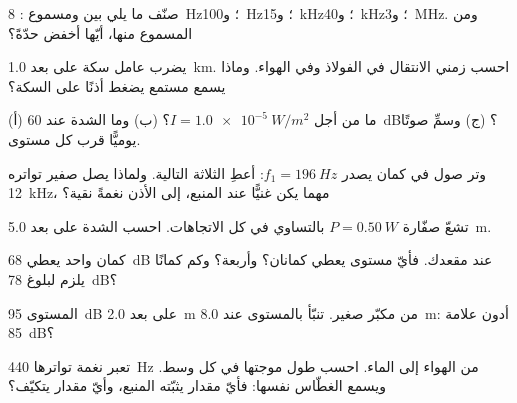 \begin{exercise}[$\star$]\label{exo:g12:sound-acoustics:2}
صنّف ما يلي بين  ومسموع : \qty{8}{Hz}؛
و\qty{100}{Hz}؛ و\qty{15}{kHz}؛ و\qty{40}{kHz}؛ و\qty{3}{MHz}. ومن المسموع
منها، أيّها أخفض حدّةً؟
\end{exercise}

\begin{exercise}[$\star$]\label{exo:g12:sound-acoustics:3}
يضرب عامل سكة على بعد \qty{1.0}{km}. احسب زمني الانتقال
في الفولاذ وفي الهواء. وماذا يسمع مستمع يضغط أذنًا
على السكة؟
\end{exercise}

\begin{exercise}[$\star$]\label{exo:g12:sound-acoustics:4}
(أ) ما  من أجل $I = \qty{1.0e-5}{W/m^2}$؟ (ب) وما
الشدة عند \qty{60}{dB}؟ (ج) وسمِّ صوتًا يوميًّا قرب كل مستوى.
\end{exercise}

\begin{exercise}[$\star$]\label{exo:g12:sound-acoustics:5}
وتر صول في كمان يصدر $f_1 = \qty{196}{Hz}$: أعطِ  الثلاثة
التالية. ولماذا يصل صفير تواتره \qty{12}{kHz}، مهما يكن غنيًّا عند
المنبع، إلى الأذن نغمةً نقية؟
\end{exercise}

\begin{exercise}[$\star\star$]\label{exo:g12:sound-acoustics:6}
تشعّ صفّارة $P = \qty{0.50}{W}$ بالتساوي في كل الاتجاهات.
احسب الشدة  على بعد \qty{5.0}{m}.
\end{exercise}

\begin{exercise}[$\star\star$]\label{exo:g12:sound-acoustics:7}
كمان واحد يعطي \qty{68}{dB} عند مقعدك. فأيّ مستوى يعطي كمانان؟
وأربعة؟ وكم كمانًا يلزم لبلوغ \qty{78}{dB}؟
\end{exercise}

\begin{exercise}[$\star\star$]\label{exo:g12:sound-acoustics:8}
المستوى \qty{95}{dB} على بعد \qty{2.0}{m} من مكبّر  صغير.
تنبّأ بالمستوى عند \qty{8.0}{m}: أدون علامة \qty{85}{dB}؟
\end{exercise}

\begin{exercise}[$\star\star$]\label{exo:g12:sound-acoustics:9}
تعبر نغمة تواترها \qty{440}{Hz} من الهواء إلى الماء. احسب
طول موجتها في كل وسط. ويسمع الغطّاس  نفسها: فأيّ
مقدار يثبّته المنبع، وأيّ مقدار يتكيّف؟
\end{exercise}


